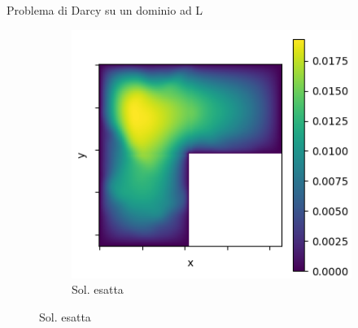 \documentclass{beamer}
\begin{document}
\begin{frame}{Problema di Darcy su un dominio ad L}
\begin{figure}
\begin{subfigure}{0.45\textwidth}
			\includegraphics[width=\textwidth]{SoluzioneL.png}
			\caption{Sol. esatta}
		\end{subfigure}
	\end{figure}
\end{frame}
\end{document}
